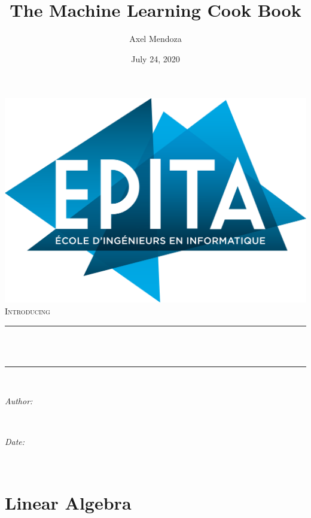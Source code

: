 \documentclass[12pt]{report}
\title{The Machine Learning Cook Book}								%
\author{Axel Mendoza}								%
\date{July 24, 2020}											%
\makeatletter
\let\thetitle\@title
\let\theauthor\@author
\let\thedate\@date
\makeatother
\begin{document}

\begin{titlepage}
	\centering
    \includegraphics[width=0.51\linewidth]{images/epita_logo.png}\\[2.0 cm]	%
    \textsc{\Large Introducing}\\[0.4 cm]
	\rule{\linewidth}{0.2 mm} \\[0.4 cm]
	{ \huge \bfseries \thetitle}\\
	\rule{\linewidth}{0.2 mm} \\[0.6 cm]
	
	\begin{minipage}{0.4\textwidth}
		\begin{flushleft} \large
			\emph{Author:}\\
			\theauthor
			\end{flushleft}
			\end{minipage}~
			\begin{minipage}{0.4\textwidth}
			\begin{flushright} \large
			\emph{Date:} \\
            \thedate									%
		\end{flushright}
		
	\end{minipage}\\[0.6cm]
	
	\vfill
	
\end{titlepage}

{
\tableofcontents
}
\pagebreak

\chapter{Linear Algebra}\label{chap1}
\end{document}
